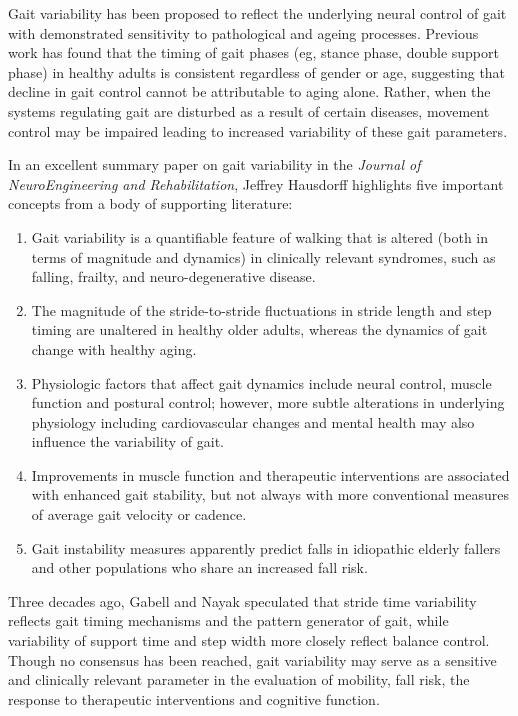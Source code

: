 \documentclass[11pt, oneside]{report}
\begin{document}
Gait variability has been proposed to reflect the underlying neural control of gait with demonstrated sensitivity to pathological and ageing processes\cite{Hausdorff2007}. Previous work has found that the timing of gait phases (eg, stance phase, double support phase) in healthy adults is consistent regardless of gender or age\cite{Jansen1982}, suggesting that decline in gait control cannot be attributable to aging alone. Rather, when the systems regulating gait are disturbed as a result of certain diseases, movement control may be impaired leading to increased variability of these gait parameters\cite{Hausdorff2005}.

In an excellent summary paper on gait variability in the \textit{Journal of NeuroEngineering and Rehabilitation}, Jeffrey Hausdorff highlights five important concepts from a body of supporting literature\cite{Hausdorff2005}:

\begin{enumerate}
  \item Gait variability is a quantifiable feature of walking that is altered (both in terms of magnitude and dynamics) in clinically relevant syndromes, such as falling, frailty, and neuro-degenerative disease.
  \item The magnitude of the stride-to-stride fluctuations in stride length and step timing are unaltered in healthy older adults, whereas the dynamics of gait change with healthy aging.
  \item Physiologic factors that affect gait dynamics include neural control, muscle function and postural control; however, more subtle alterations in underlying physiology including cardiovascular changes and mental health may also influence the variability of gait.
  \item Improvements in muscle function and therapeutic interventions are associated with enhanced gait stability, but not always with more conventional measures of average gait velocity or cadence.
  \item Gait instability measures apparently predict falls in idiopathic elderly fallers and other populations who share an increased fall risk.
\end{enumerate}

Three decades ago, Gabell and Nayak speculated that stride time variability reflects gait timing mechanisms and the pattern generator of gait, while variability of support time and step width more closely reflect balance control\cite{Gabell1984}. Though no consensus has been reached, gait variability may serve as a sensitive and clinically relevant parameter in the evaluation of mobility, fall risk, the response to therapeutic interventions and cognitive function\cite{Hausdorff2005}.
\end{document}
